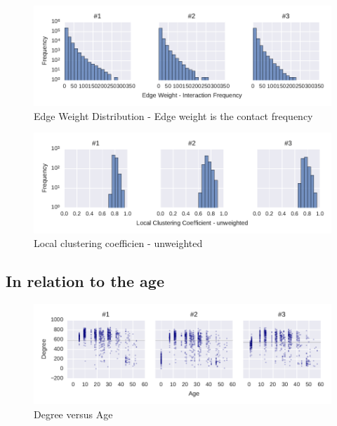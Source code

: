 \begin{figure}[htb]
	\centering
	\includegraphics[width=1.0\textwidth]{Figures/stat-edgeWeightDist}
	\caption[Edge Weight Distribution]{Edge Weight Distribution - Edge weight is the contact frequency}
	\label{fig:statEdgeWeightDist}
\end{figure}


\begin{figure}[htb]
	\centering
	\includegraphics[width=1.0\textwidth]{Figures/stat-lccDist}
	\caption[Local clustering coefficien]{Local clustering coefficien - unweighted}
	\label{fig:lccDist}
\end{figure}

\subsection{In relation to the age}

\begin{figure}[htb]
	\centering
	\includegraphics[width=1.0\textwidth]{Figures/stat-degreeAge}
	\caption[Degree VS Age]{Degree versus Age}
	\label{fig:degreeAge}
\end{figure}


